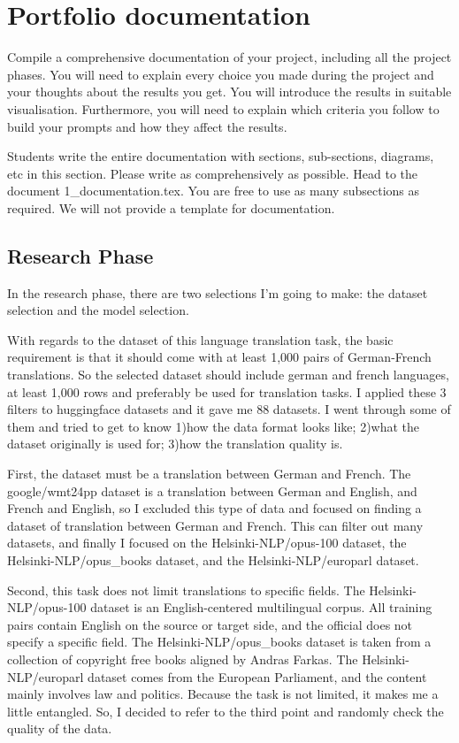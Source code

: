 \setcounter{page}{1}
\section{Portfolio documentation}
\label{sec:documentation}

Compile a comprehensive documentation of your project, including all the project phases. You will need to explain every choice you made during the project and your thoughts about the results you get. You will introduce the results in suitable visualisation. Furthermore, you will need to explain which criteria you follow to build your prompts and how they affect the results. 

Students write the entire documentation with sections, sub-sections, diagrams, etc in this section. Please write as comprehensively as possible. Head to the document 1\_documentation.tex. You are free to use as many subsections as required. We will not provide a template for documentation. 

\subsection{Research Phase}
\label{subsec:research}
In the research phase, there are two selections I'm going to make: the dataset selection and the model selection.

With regards to the dataset of this language translation task,
the basic requirement is that it should come with at least 1,000 pairs of German-French translations.
So the selected dataset should include german and french languages, at least 1,000 rows and preferably be used for translation tasks.
I applied these 3 filters to huggingface datasets and it gave me 88 datasets. 
I went through some of them and tried to get to know
1)how the data format looks like; 
2)what the dataset originally is used for;
3)how the translation quality is. 

First, the dataset must be a translation between German and French.
The google/wmt24pp dataset is a translation between German and English, and French and English,
so I excluded this type of data and focused on finding a dataset of translation between German and French.
This can filter out many datasets, and finally 
I focused on the Helsinki-NLP/opus-100 dataset, 
the Helsinki-NLP/opus\_books dataset, and the Helsinki-NLP/europarl dataset.

Second, this task does not limit translations to specific fields.
The Helsinki-NLP/opus-100 dataset is an English-centered multilingual corpus.
All training pairs contain English on the source or target side,
and the official does not specify a specific field.
The Helsinki-NLP/opus\_books dataset is taken from
a collection of copyright free books aligned by Andras Farkas.
The Helsinki-NLP/europarl dataset comes from the European Parliament, 
and the content mainly involves law and politics. 
Because the task is not limited, it makes me a little entangled.
So, I decided to refer to the third point and randomly check the quality of the data.

